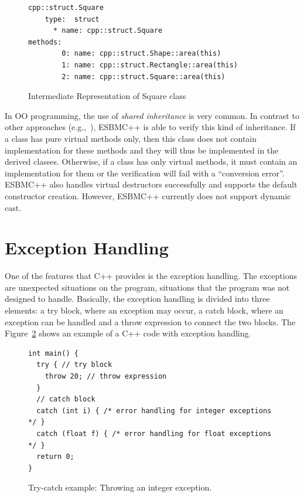 \documentclass[a4paper]{llncs}
\begin{document}
\begin{figure}[h]
\centering
\begin{minipage}{0.9\textwidth}
\begin{lstlisting}[style=nonumbers]
cpp::struct.Square
    type:  struct
      * name: cpp::struct.Square
methods:
        0: name: cpp::struct.Shape::area(this)
        1: name: cpp::struct.Rectangle::area(this)
        2: name: cpp::struct.Square::area(this)
\end{lstlisting}
\end{minipage}
\caption{Intermediate Representation of Square class}
\label{figure:IR_uml_square}
\end{figure}

In OO programming, the use of \textit{shared inheritance} is very common.
In contrast to other approaches (e.g.,~\cite{Blanc07}), ESBMC++ is able to
verify this kind of inheritance. If a class has pure virtual methods only,
then this class does not contain implementation for these methods and they will
thus be implemented in the derived classes. Otherwise, if a class has only virtual
methods, it must contain an implementation for them or the verification will fail
with a ``conversion error''. ESBMC++ also handles virtual destructors successfully
and supports the default constructor creation. However, ESBMC++ currently does not
support dynamic cast.

\section{Exception Handling}
\label{exception-handling}

One of the features that C++ provides is the exception handling. The exceptions are unexpected situations on the program, situations
that the program was not designed to handle. Basically, the exception handling is divided into three elements: a try block, where an
exception may occur, a catch block, where an exception can be handled and a throw expression to connect the two blocks. The
Figure~\ref{figure:try-catch-example} shows an example of a C++ code with exception handling.

\begin{figure}[ht]
\centering
\begin{minipage}{1.0\textwidth}
\begin{lstlisting}
int main() {
  try { // try block
    throw 20; // throw expression
  }
  // catch block
  catch (int i) { /* error handling for integer exceptions */ }
  catch (float f) { /* error handling for float exceptions */ }
  return 0;
}
\end{lstlisting}
\end{minipage}
\caption{Try-catch example: Throwing an integer exception.}
\label{figure:try-catch-example}
\end{figure}
\end{document}
